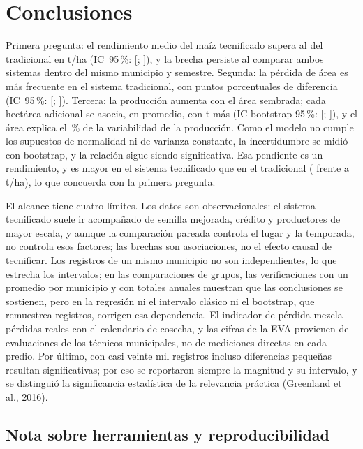 \documentclass[12pt,letterpaper]{article}
\begin{document}
\section{Conclusiones}

Primera pregunta: el rendimiento medio del maíz tecnificado supera al del
tradicional en \WDif{} t/ha (IC~95\,\%: [\WicInf; \WicSup]), y la brecha
persiste al comparar ambos sistemas dentro del mismo municipio y semestre.
Segunda: la pérdida de área es más frecuente en el sistema tradicional, con
\DifProp{} puntos porcentuales de diferencia (IC~95\,\%: [\DifPropInf;
\DifPropSup]). Tercera: la producción aumenta con el área sembrada; cada
hectárea adicional se asocia, en promedio, con \RGPenEst{} t más (IC bootstrap
95\,\%: [\RGBootLi; \RGBootLs]), y el área explica el \RGRdosPct\,\% de la
variabilidad de la producción. Como el modelo no cumple los supuestos de
normalidad ni de varianza constante, la incertidumbre se midió con bootstrap,
y la relación sigue siendo significativa. Esa pendiente es un rendimiento, y
es mayor en el sistema tecnificado que en el tradicional (\RTecPenEst{} frente
a \RTradPenEst{} t/ha), lo que concuerda con la primera pregunta.

El alcance tiene cuatro límites. Los datos son observacionales: el sistema
tecnificado suele ir acompañado de semilla mejorada, crédito y productores de
mayor escala, y aunque la comparación pareada controla el lugar y la
temporada, no controla esos factores; las brechas son asociaciones, no el efecto causal
de tecnificar. Los registros de un mismo municipio no son independientes, lo
que estrecha los intervalos; en las comparaciones de grupos, las
verificaciones con un promedio por municipio y con totales anuales muestran
que las conclusiones se sostienen, pero en la regresión ni el intervalo
clásico ni el bootstrap, que remuestrea registros, corrigen esa dependencia. El
indicador de pérdida mezcla pérdidas reales con el calendario de cosecha, y
las cifras de la EVA provienen de evaluaciones de los técnicos municipales,
no de mediciones directas en cada predio. Por último, con casi veinte mil registros incluso diferencias
pequeñas resultan significativas; por eso se reportaron siempre la magnitud y
su intervalo, y se distinguió la significancia estadística de la relevancia
práctica (Greenland et al., 2016).

\subsection{Nota sobre herramientas y reproducibilidad}
\end{document}
